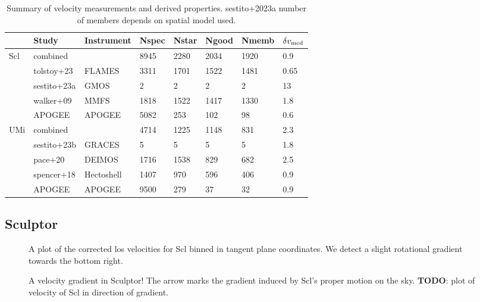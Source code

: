 \begin{table*}[t]
\centering
\caption{Summary of velocity measurements and derived properties. sestito+2023a number of members depends on spatial model used.}
\label{tbl:Summary-of-velocity-measurements-and-derived-properties-sestito+2023a-number-of-members-depends-on-spatial-model-used}
\begin{tabular}{llllllll}
\toprule
 & Study & Instrument & Nspec & Nstar & Ngood & Nmemb & $\delta v_{\rm med}$\\
\midrule
Scl & combined &  & 8945 & 2280 & 2034 & 1920 & 0.9\\
 & tolstoy+23 & FLAMES & 3311 & 1701 & 1522 & 1481 & 0.65\\
 & sestito+23a & GMOS & 2 & 2 & 2 & 2 & 13\\
 & walker+09 & MMFS & 1818 & 1522 & 1417 & 1330 & 1.8\\
 & APOGEE & APOGEE & 5082 & 253 & 102 & 98 & 0.6\\
UMi & combined &  & 4714 & 1225 & 1148 & 831 & 2.3\\
 & sestito+23b & GRACES & 5 & 5 & 5 & 5 & 1.8\\
 & pace+20 & DEIMOS & 1716 & 1538 & 829 & 682 & 2.5\\
 & spencer+18 & Hectoshell & 1407 & 970 & 596 & 406 & 0.9\\
 & APOGEE & APOGEE & 9500 & 279 & 37 & 32 & 0.9\\
\bottomrule
\end{tabular}
\end{table*}

\subsection{Sculptor}\label{sculptor}

\begin{figure}
\centering
{}
\caption[Scl velocity sample]{A plot of the corrected los velocities for
Scl binned in tangent plane coordinates. We detect a slight rotational
gradient towards the bottom right.}
\end{figure}

\begin{figure}
\centering
{}
\caption[Scl velocity gradient]{A velocity gradient in Sculptor! The
arrow marks the gradient induced by Scl's proper motion on the sky.
\textbf{TODO}: plot of velocity of Scl in direction of gradient.}
\end{figure}

